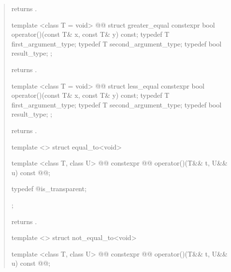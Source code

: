 \begin{quote}
\begin{itemdescr}
\pnum
{} returns .
\end{itemdescr}

%
\begin{itemdecl}
template <class T = void>
  @@
struct greater_equal {
  constexpr bool operator()(const T& x, const T& y) const;
  typedef T first_argument_type;
  typedef T second_argument_type;
  typedef bool result_type;
};
\end{itemdecl}

\begin{itemdescr}
\pnum
{} returns .
\end{itemdescr}

%
\begin{itemdecl}
template <class T = void>
  @@
struct less_equal {
  constexpr bool operator()(const T& x, const T& y) const;
  typedef T first_argument_type;
  typedef T second_argument_type;
  typedef bool result_type;
};
\end{itemdecl}

\begin{itemdescr}
\pnum
{} returns .
\end{itemdescr}

%
\begin{itemdecl}
template <> struct equal_to<void> {
  template <class T, class U>
    @@
  constexpr @@ operator()(T&& t, U&& u) const
    @@;

  typedef @\unspec@ is_transparent;
};
\end{itemdecl}

\begin{itemdescr}
\pnum
{} returns .
\end{itemdescr}

%
\begin{itemdecl}
template <> struct not_equal_to<void> {
  template <class T, class U>
    @@
  constexpr @@ operator()(T&& t, U&& u) const
    @@;

}
\end{itemdecl}
\end{quote}
